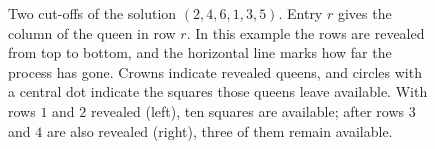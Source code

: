 \begin{figure}[htbp]
\centering
{}
\caption{Two cut-offs of the solution \((2,4,6,1,3,5)\). Entry \(r\) gives the column of the queen in row
\(r\). In this example the rows are revealed from top to bottom, and the horizontal line marks how far
the process has gone. Crowns indicate revealed queens, and circles with a central dot indicate the
squares those
queens leave available. With rows \(1\) and \(2\) revealed (left), ten squares are
available; after rows \(3\) and \(4\) are also revealed (right), three of them remain available.}
\label{fig:cortes}
\end{figure}
